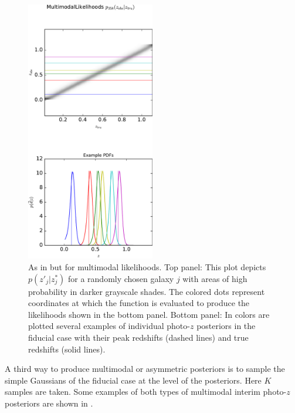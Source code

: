 \begin{figure}
	\includegraphics[width=0.5\textwidth]{figures/chippr/mult_zobsvztru.pdf}
	\caption{As in  but for multimodal likelihoods.  
		Top panel: This plot depicts $p(z'_{j}|z^{*}_{j})$ for a randomly chosen galaxy $j$ with areas of high probability in darker grayscale shades.  
		The colored dots represent coordinates at which the function is evaluated to produce the likelihoods shown in the bottom panel.  
		Bottom panel: In colors are plotted several examples of individual photo-$z$ posteriors in the fiducial case with their peak redshifts (dashed lines) and true redshifts (solid lines).}
\end{figure}

A third way to produce multimodal or asymmetric posteriors is to sample the simple Gaussians of the fiducial case at the level of the posteriors.  
Here $K$ samples are taken.  
Some examples of both types of multimodal interim photo-$z$ posteriors are shown in .  

